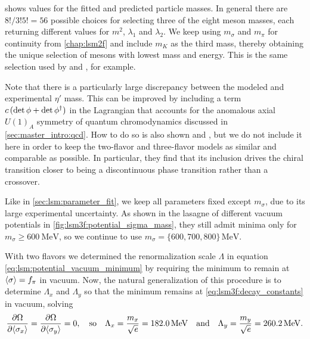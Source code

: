  shows values for the fitted and predicted particle masses.
In general there are $8!/3!5! = 56$ possible choices for selecting three of the eight meson masses,
each returning different values for $m^2$, $\lambda_1$ and $\lambda_2$.
We keep using $m_\sigma$ and $m_\pi$ for continuity from \cref{chap:lsm2f}
and include $m_K$ as the third mass, thereby obtaining the unique selection of mesons with lowest mass and energy.
This is the same selection used by \cite{ref:lsm3f} and \cite{ref:lsm3f_details}, for example.

Note that there is a particularly large discrepancy between the modeled and experimental $\eta'$ mass.
This can be improved by including a term $c \, (\operatorname{det}{\phi} + \operatorname{det}{\phi^\dagger})$ in the Lagrangian that accounts for the anomalous axial $U(1)_A$ symmetry of quantum chromodynamics discussed in \cref{sec:master_intro:qcd}.
How to do so is also shown \cite{ref:lsm3f} and \cite{ref:lsm3f_details},
but we do not include it here in order to keep the two-flavor and three-flavor models as similar and comparable as possible.
In particular, they find that its inclusion drives the chiral transition closer to being a discontinuous phase transition rather than a crossover.

Like in \cref{sec:lsm:parameter_fit},
we keep all parameters fixed except $m_\sigma$, due to its large experimental uncertainty.
As shown in the lasagne of different vacuum potentials in \cref{fig:lsm3f:potential_sigma_mass},
they still admit minima only for $m_\sigma \geq \SI{600}{\mega\electronvolt}$,
so we continue to use $m_\sigma=\{600,700,800\} \, \si{\mega\electronvolt}$.

With two flavors we determined the renormalization scale $\Lambda$ in equation \eqref{eq:lsm:potential_vacuum_minimum} by requiring the minimum to remain at $\langle \sigma \rangle=f_\pi$ in vacuum.
Now, the natural generalization of this procedure is to determine $\Lambda_x$ and $\Lambda_y$ so that the minimum remains at \eqref{eq:lsm3f:decay_constants} in vacuum, solving
\begin{equation}
	\pdv{\Omega}{ \langle \sigma_x \rangle} = \pdv{\Omega}{ \langle \sigma_y \rangle} = 0,
	\quad \text{so}
	\quad \Lambda_x = \frac{m_x}{\sqrt{e}} = \SI{182.0}{\mega\electronvolt}
	\quad \text{and} \quad
	\Lambda_y = \frac{m_y}{\sqrt{e}} = \SI{260.2}{\mega\electronvolt}.
\end{equation}

